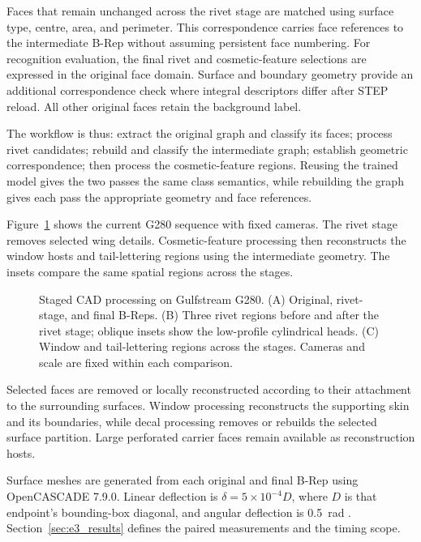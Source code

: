 \documentclass[12pt,a4paper]{article}
\begin{document}
Faces that remain unchanged across the rivet stage are matched using surface type, centre, area, and perimeter. This correspondence carries face references to the intermediate B-Rep without assuming persistent face numbering. For recognition evaluation, the final rivet and cosmetic-feature selections are expressed in the original face domain. Surface and boundary geometry provide an additional correspondence check where integral descriptors differ after STEP reload. All other original faces retain the background label.

The workflow is thus: extract the original graph and classify its faces; process rivet candidates; rebuild and classify the intermediate graph; establish geometric correspondence; then process the cosmetic-feature regions. Reusing the trained model gives the two passes the same class semantics, while rebuilding the graph gives each pass the appropriate geometry and face references.

Figure~\ref{fig:geometry_protocol} shows the current G280 sequence with fixed cameras. The rivet stage removes selected wing details. Cosmetic-feature processing then reconstructs the window hosts and tail-lettering regions using the intermediate geometry. The insets compare the same spatial regions across the stages.

\begin{figure}[!ht]
\centering

\caption{Staged CAD processing on Gulfstream G280. (A) Original, rivet-stage, and final B-Reps. (B) Three rivet regions before and after the rivet stage; oblique insets show the low-profile cylindrical heads. (C) Window and tail-lettering regions across the stages. Cameras and scale are fixed within each comparison.}\label{fig:geometry_protocol}
\end{figure}

Selected faces are removed or locally reconstructed according to their attachment to the surrounding surfaces. Window processing reconstructs the supporting skin and its boundaries, while decal processing removes or rebuilds the selected surface partition. Large perforated carrier faces remain available as reconstruction hosts.

Surface meshes are generated from each original and final B-Rep using OpenCASCADE 7.9.0. Linear deflection is $\delta=5\times10^{-4}D$, where $D$ is that endpoint's bounding-box diagonal, and angular deflection is 0.5~rad \parencite{occt_mesh_2026}. Section~\ref{sec:e3_results} defines the paired measurements and the timing scope.
\end{document}
